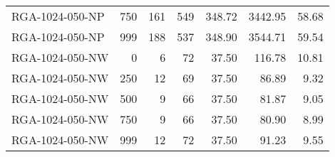 \begin{table}[htbp]
{\begin{tabular}{lrrrrrr}
    RGA-1024-050-NP & 750    & 161    & 549    & 348.72 & 3442.95 & 58.68 \\
    RGA-1024-050-NP & 999    & 188    & 537    & 348.90 & 3544.71 & 59.54 \\ \hline
    RGA-1024-050-NW & 0      & 6      & 72     & 37.50  & 116.78 & 10.81 \\
    RGA-1024-050-NW & 250    & 12     & 69     & 37.50  & 86.89  & 9.32 \\
    RGA-1024-050-NW & 500    & 9      & 66     & 37.50  & 81.87  & 9.05 \\
    RGA-1024-050-NW & 750    & 9      & 66     & 37.50  & 80.90  & 8.99 \\
    RGA-1024-050-NW & 999    & 12     & 72     & 37.50  & 91.23  & 9.55 \\
    \bottomrule
    \end{tabular}}
  \label{tab:addlabel}%
\end{table}%

